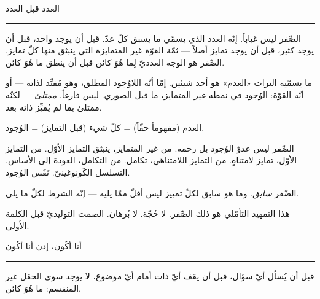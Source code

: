 \documentclass[10pt, openany, oneside]{book}
\renewcommand{\large}{\fontsize{11.5}{14}\selectfont}
\begin{document}
\begin{center}
    {\large العدد قبل العدد}\\[0.3em]
    \rule{0.2\textwidth}{0.3pt}
\end{center}

\vspace{1em}

\noindent الصِّفر ليس غياباً. إنّه العدد الذي يسمّي ما يسبق كلّ عدّ. قبل أن يوجد واحد، قبل أن يوجد كثير، قبل أن يوجد تمايز أصلاً --- ثمّة القوّة غير المتمايزة التي ينبثق منها كلّ تمايز. الصِّفر هو الوجه العدديّ لِما هُوَ كائن قبل أن ينطق ما هُوَ كائن.

\vspace{0.5em}

\noindent ما يسمّيه التراث «العدم» هو أحد شيئين. إمّا أنّه اللاوُجود المطلق، وهو مُفنِّد لذاته --- أو أنّه القوّة: الوُجود في نمطه غير المتمايز، ما قبل الصوري. ليس فارغاً. \textit{ممتلئ} --- لكنّه ممتلئ بما لم يُميِّز ذاته بعد.

\vspace{0.5em}

\noindent العدم (مفهوماً حقّاً) = كلّ شيء (قبل التمايز) = الوُجود.

\vspace{0.5em}

\noindent الصِّفر ليس عدوّ الوُجود بل رحمه. من غير المتمايز، ينبثق التمايز الأوّل. من التمايز الأوّل، تمايز لامتناهٍ. من التمايز اللامتناهي، تكامل. من التكامل، العودة إلى الأساس. التسلسل الكَونوغينيّ. نَفَس الوُجود.

\vspace{0.5em}

\noindent الصِّفر \textit{سابق}. وما هو سابق لكلّ تمييز ليس أقلّ ممّا يليه --- إنّه الشرط لكلّ ما يلي.

\vspace{0.5em}

\noindent هذا التمهيد التأمّلي هو ذلك الصِّفر. لا حُجّة. لا بُرهان. الصمت التوليديّ قبل الكلمة الأولى.

\vspace{2em}

\begin{center}
    {\large أنا أكُون، إذن أنا أكُون}\\[0.3em]
    \rule{0.2\textwidth}{0.3pt}
\end{center}

\vspace{1em}

\noindent قبل أن يُسأل أيّ سؤال، قبل أن يقف أيّ ذات أمام أيّ موضوع، لا يوجد سوى الحقل غير المنقسم: ما هُوَ كائن.
\end{document}
